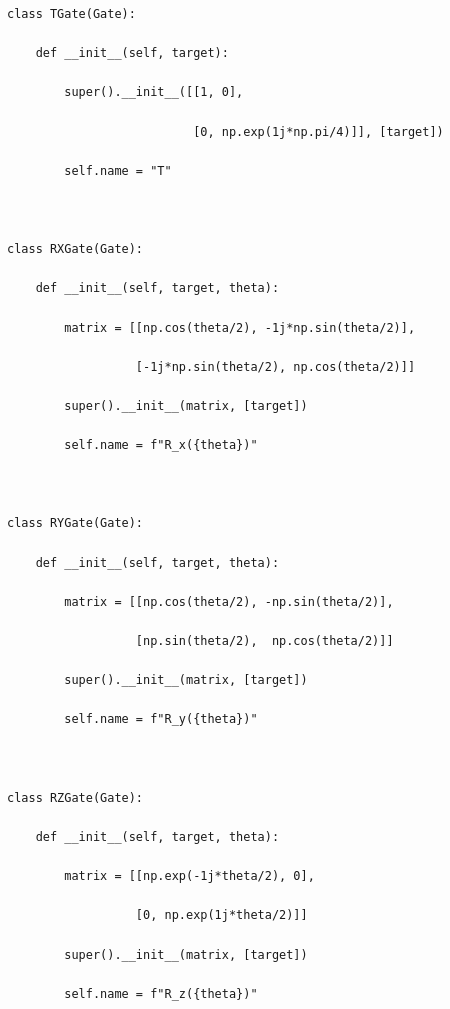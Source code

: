 \documentclass{beamer}
\begin{document}
\begin{frame}
\begin{verbatim}
class TGate(Gate):

    def __init__(self, target):

        super().__init__([[1, 0],

                          [0, np.exp(1j*np.pi/4)]], [target])

        self.name = "T"



class RXGate(Gate):

    def __init__(self, target, theta):

        matrix = [[np.cos(theta/2), -1j*np.sin(theta/2)],

                  [-1j*np.sin(theta/2), np.cos(theta/2)]]

        super().__init__(matrix, [target])

        self.name = f"R_x({theta})"



class RYGate(Gate):

    def __init__(self, target, theta):

        matrix = [[np.cos(theta/2), -np.sin(theta/2)],

                  [np.sin(theta/2),  np.cos(theta/2)]]

        super().__init__(matrix, [target])

        self.name = f"R_y({theta})"



class RZGate(Gate):

    def __init__(self, target, theta):

        matrix = [[np.exp(-1j*theta/2), 0],

                  [0, np.exp(1j*theta/2)]]

        super().__init__(matrix, [target])

        self.name = f"R_z({theta})"

\end{verbatim}
\end{frame}
\end{document}
